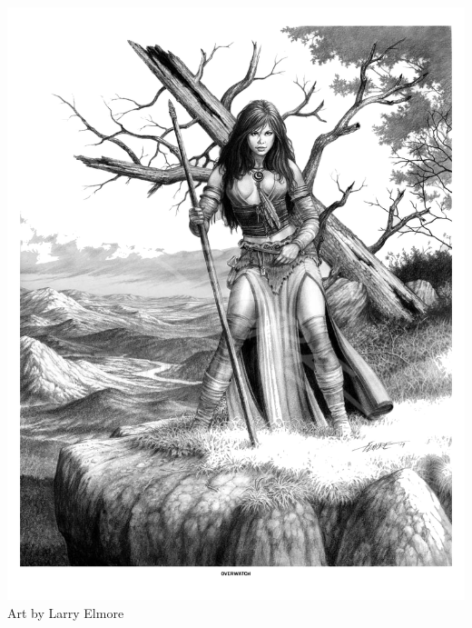 \begin{multicols*}{2}
\begin{Figure}
\centering
\includegraphics[width=\textwidth]{img/druid-2.png}
{\scriptsize Art by Larry Elmore}
\end{Figure}
    
\end{multicols*}


\clearpage

